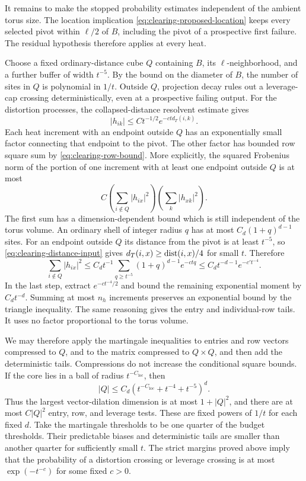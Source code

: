 It remains to make the stopped probability estimates independent of the
ambient torus size. The location implication
\eqref{eq:clearing-proposed-location} keeps every selected pivot within
$\ell/2$ of $B$, including the pivot of a prospective first failure.
The residual hypothesis therefore applies at every heat.

Choose a fixed ordinary-distance cube $Q$ containing $B$, its
$\ell$-neighborhood, and a further buffer of width $t^{-5}$.  By the bound
on the diameter of $B$, the number of sites in $Q$ is polynomial in $1/t$.
Outside $Q$, projection decay rules out a leverage-cap crossing
deterministically, even at a prospective failing output.  For the distortion
processes, the collapsed-distance resolvent estimate gives
\[
 |h_{ik}|\le Ct^{-1/2}e^{-ctd_T(i,k)}.
\]
Each heat increment with an endpoint outside $Q$ has an exponentially small
factor connecting that endpoint to the pivot.  The other factor has bounded
row square sum by \eqref{eq:clearing-row-bound}.  More explicitly, the
squared Frobenius norm of the portion of one increment with at least one
endpoint outside $Q$ is at most
\[
 C\left(\sum_{i\notin Q}|h_{ix}|^2\right)
   \left(\sum_k|h_{xk}|^2\right).
\]
The first sum has a dimension-dependent bound which is still independent
of the torus volume.  An ordinary shell of integer radius $q$ has at most
$C_d(1+q)^{d-1}$ sites.  For an endpoint outside $Q$ its distance from the
pivot is at least $t^{-5}$, so \eqref{eq:clearing-distance-input} gives
$d_T(i,x)\ge\operatorname{dist}(i,x)/4$ for small $t$.  Therefore
\[
 \sum_{i\notin Q}|h_{ix}|^2
 \le C_dt^{-1}\sum_{q\ge t^{-5}}(1+q)^{d-1}e^{-ctq}
 \le C_dt^{-d-1}e^{-c't^{-4}}.
\]
In the last step, extract $e^{-ct^{-4}/2}$ and bound the remaining
exponential moment by $C_dt^{-d}$.  Summing at most $n_h$ increments preserves an
exponential bound by the triangle inequality.  The same reasoning gives the
entry and individual-row tails.  It uses no factor proportional to the torus
volume.

We may therefore apply the martingale inequalities to entries and row vectors
compressed to $Q$, and to the matrix compressed to $Q\times Q$, and then add
the deterministic tails.  Compressions do not increase the conditional
square bounds.  If the core lies in a ball of radius $t^{-C_{\mathrm{loc}}}$, then
\[
 |Q|\le C_d(t^{-C_{\mathrm{loc}}}+t^{-4}+t^{-5})^d.
\]
Thus the largest vector-dilation dimension is at most $1+|Q|^2$, and there
are at most $C|Q|^2$ entry, row, and leverage tests.  These are fixed powers
of $1/t$ for each fixed $d$.  Take the martingale thresholds to be one quarter of the
budget thresholds.  Their predictable biases and deterministic tails are
smaller than another quarter for sufficiently small $t$.  The strict margins
proved above imply that the probability of a distortion crossing or leverage
crossing is at most $\exp(-t^{-c})$ for some fixed $c>0$.


